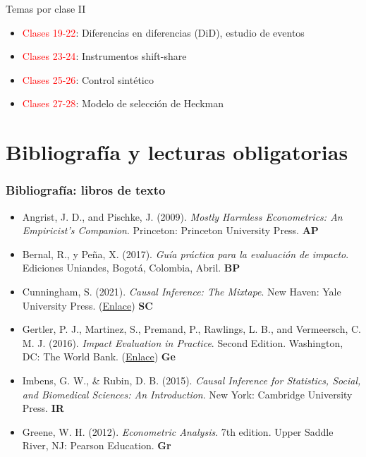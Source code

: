 \documentclass[10pt, xcolor=dvipsnames]{beamer}
\begin{document}
\begin{frame}{Temas por clase II}
    \begin{itemize}[itemsep=0.1em, parsep=0pt]
    \item \textcolor{red}{Clases 19-22}: Diferencias en diferencias (DiD), estudio de eventos
    \item \textcolor{red}{Clases 23-24}: Instrumentos shift-share
    \item \textcolor{red}{Clases 25-26}: Control sintético
    \item \textcolor{red}{Clases 27-28}: Modelo de selección de Heckman
\end{itemize}
\end{frame}


\section{Bibliografía y lecturas obligatorias}

\begin{frame}\frametitle{Bibliografía: libros de texto}
 	\fontvid
\begin{itemize}[itemsep=0.5em, parsep=0pt]
    \item Angrist, J. D., and Pischke, J. (2009). \textit{Mostly Harmless Econometrics: An Empiricist's Companion}. Princeton: Princeton University Press. \textbf{AP}   
    \item Bernal, R., y Peña, X. (2017). \textit{Guía práctica para la evaluación de impacto}. Ediciones Uniandes, Bogotá, Colombia, Abril. \textbf{BP}     
    \item Cunningham, S. (2021). \textit{Causal Inference: The Mixtape}. New Haven: Yale University Press. (\href{https://mixtape.scunning.com/}{Enlace}) \textbf{SC}    
    \item Gertler, P. J., Martinez, S., Premand, P., Rawlings, L. B., and Vermeersch, C. M. J. (2016). \textit{Impact Evaluation in Practice}. Second Edition. Washington, DC: The World Bank. (\href{https://www.worldbank.org/en/programs/sief-trust-fund/publication/impact-evaluation-in-practice}{Enlace}) \textbf{Ge}
    \item Imbens, G. W., \& Rubin, D. B. (2015). \textit{Causal Inference for Statistics, Social, and Biomedical Sciences: An Introduction}. New York: Cambridge University Press. \textbf{IR}    
    \item Greene, W. H. (2012). \textit{Econometric Analysis}. 7th edition. Upper Saddle River, NJ: Pearson Education. \textbf{Gr}
\end{itemize}
\end{frame}
\end{document}
